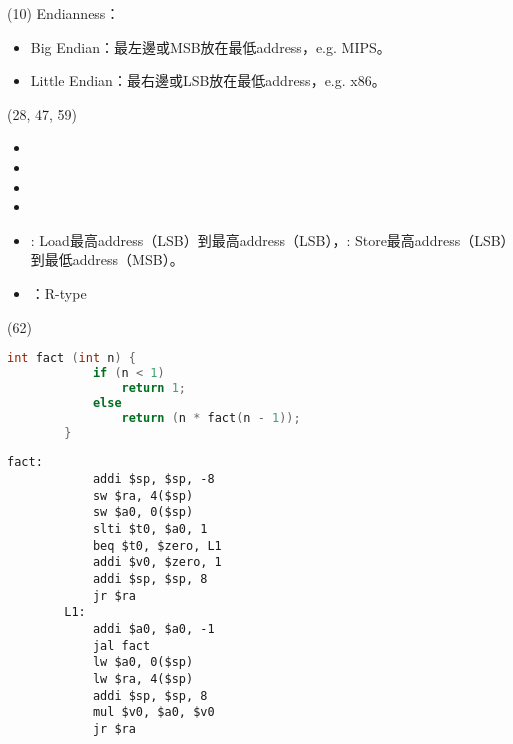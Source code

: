 \item \begin{theorem}{(10)} Endianness：\begin{itemize}
        \item Big Endian：最左邊或MSB放在最低address，e.g. MIPS。
        \item Little Endian：最右邊或LSB放在最低address，e.g. x86。
    \end{itemize}
\end{theorem}

\item \begin{theorem}{(28, 47, 59)} \quad\quad \begin{itemize}
        \item {}
        \item {}
        \item {}
        \item {}
        \item {}: Load最高address（LSB）到最高address（LSB），: Store最高address（LSB）到最低address（MSB）。
        \item {}：R-type
    \end{itemize}
\end{theorem}

\item \begin{theorem}{(62)} \quad\quad \begin{lstlisting}[language={C}]
        int fact (int n) {
            if (n < 1)
                return 1;
            else
                return (n * fact(n - 1));            
        }
    \end{lstlisting}
    \begin{lstlisting}[language={[x86masm]Assembler}]
        fact:
            addi $sp, $sp, -8
            sw $ra, 4($sp)
            sw $a0, 0($sp)
            slti $t0, $a0, 1
            beq $t0, $zero, L1
            addi $v0, $zero, 1
            addi $sp, $sp, 8
            jr $ra
        L1:
            addi $a0, $a0, -1
            jal fact
            lw $a0, 0($sp)
            lw $ra, 4($sp)
            addi $sp, $sp, 8
            mul $v0, $a0, $v0
            jr $ra
    \end{lstlisting}
\end{theorem}

